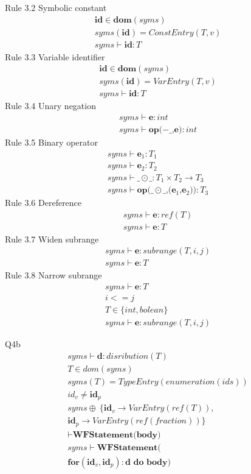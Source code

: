 Rule 3.2 Symbolic constant
\begin{gather*}
    \textbf{id} \in \textbf{dom}(syms)\\
    syms(\textbf{id}) = ConstEntry(T, v)\\
    \hline
    syms \vdash \textbf{id} : T
\end{gather*}
Rule 3.3 Variable identifier
\begin{gather*}
    \textbf{id} \in \textbf{dom}(syms)\\
    syms(\textbf{id}) = VarEntry(T, v)\\
    \hline
    syms \vdash \textbf{id} : T
\end{gather*}
Rule 3.4 Unary negation
\begin{gather*}
    syms \vdash \textbf{e} : int\\
    \hline
    syms \vdash \textbf{op($- \_$,e)} : int
\end{gather*}
Rule 3.5 Binary operator
\begin{gather*}
    syms \vdash \textbf{e$_1$} : T_1\\
    syms \vdash \textbf{e$_2$} : T_2\\
    syms \vdash \_ \odot \_ : T_1 \times T_2 \rightarrow T_3\\
    \hline
    syms \vdash \textbf{op($\_ \odot \_ $,(e$_1$,e$_2$))} : T_3
\end{gather*}
Rule 3.6 Dereference
\begin{gather*}
    syms \vdash \textbf{e} : ref(T)\\
    \hline
    syms \vdash \textbf{e} : T
\end{gather*}
Rule 3.7 Widen subrange
\begin{gather*}
    syms \vdash \textbf{e} : subrange(T, i, j)\\
    \hline
    syms \vdash \textbf{e} : T
\end{gather*}
Rule 3.8 Narrow subrange
\begin{gather*}
    syms \vdash \textbf{e} : T\\
    i <= j\\
    T \in \{int,bolean\}\\
    \hline
    syms \vdash \textbf{e} : subrange(T, i, j)
\end{gather*}

Q4b
\begin{gather*}
    syms \vdash \textbf{d} : disribution(T)\\
    T \in dom(syms)\\
    syms(T) = TypeEntry(enumeration(ids))\\
    id_v \neq \textbf{id}_p\\
    syms \oplus \ \{\textbf{id}_v \rightarrow VarEntry(ref(T)), \\
    \textbf{id}_p \rightarrow VarEntry(ref(fraction))\} \\
    \vdash \textbf{WFStatement(body)}\\
    \hline
    syms \vdash \textbf{WFStatement}( \\
    \textbf{for}(\textbf{id}_v, \textbf{id}_p) : \textbf{d do body})
\end{gather*}